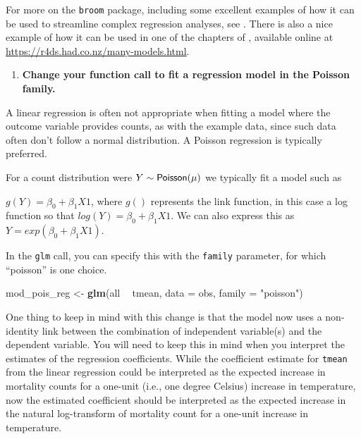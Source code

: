 \documentclass[
]{book}
\newenvironment{Shaded}{\begin{snugshade}}{\end{snugshade}}
\newcommand{\DataTypeTok}[1]{\textcolor[rgb]{0.13,0.29,0.53}{#1}}
\newcommand{\KeywordTok}[1]{\textcolor[rgb]{0.13,0.29,0.53}{\textbf{#1}}}
\newcommand{\NormalTok}[1]{#1}
\newcommand{\OperatorTok}[1]{\textcolor[rgb]{0.81,0.36,0.00}{\textbf{#1}}}
\newcommand{\StringTok}[1]{\textcolor[rgb]{0.31,0.60,0.02}{#1}}
\providecommand{\tightlist}{%
  \setlength{\itemsep}{0pt}\setlength{\parskip}{0pt}}
\begin{document}
For more on the \texttt{broom} package, including some excellent examples of how it
can be used to streamline complex regression analyses, see \citet{robinson2014broom}.
There is also a nice example of how it can be used in one of the chapters of
\citet{wickham2016r}, available online at \url{https://r4ds.had.co.nz/many-models.html}.

\begin{enumerate}
\def\labelenumi{\arabic{enumi}.}
\setcounter{enumi}{1}
\tightlist
\item
  \textbf{Change your function call to fit a regression model in the Poisson family.}
\end{enumerate}

A linear regression is often not appropriate when fitting a model where the
outcome variable provides counts, as with the example data, since such data
often don't follow a normal distribution. A Poisson regression
is typically preferred.

For a count distribution were \(Y \sim {\sf Poisson(\mu)}\) we typically fit a model
such as

\(g(Y)=\beta_{0}+\beta_{1}X1\), where \(g()\) represents the link function, in this
case a log function so that \(log(Y)=\beta_{0}+\beta_{1}X1\). We can also express
this as \(Y=exp(\beta_{0}+\beta_{1}X1)\).

In the \texttt{glm} call, you can specify this with the \texttt{family}
parameter, for which ``poisson'' is one choice.

\begin{Shaded}
\begin{Highlighting}[]
\NormalTok{mod_pois_reg <-}\StringTok{ }\KeywordTok{glm}\NormalTok{(all }\OperatorTok{~}\StringTok{ }\NormalTok{tmean, }\DataTypeTok{data =}\NormalTok{ obs, }\DataTypeTok{family =} \StringTok{"poisson"}\NormalTok{)}
\end{Highlighting}
\end{Shaded}

One thing to keep in mind with this change is that the model now uses a
non-identity link between the combination of independent variable(s) and the
dependent variable. You will need to keep this in mind when you interpret
the estimates of the regression coefficients. While the coefficient estimate
for \texttt{tmean} from the linear regression could be interpreted as the expected
increase in mortality counts for a one-unit (i.e., one degree Celsius) increase
in temperature, now the estimated coefficient should be interpreted as the
expected increase in the natural log-transform of mortality count for a one-unit
increase in temperature.
\end{document}
